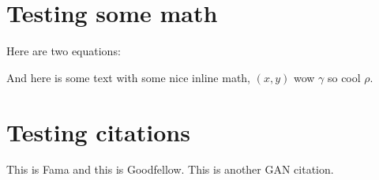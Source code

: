 \section{Testing some math}
Here are two equations:





And here is some text with some nice inline math, $(x, y)$ wow $\gamma$ so cool $\rho$.


\section{Testing citations}
This is Fama\cite{fama_efficient_market} and this is Goodfellow.
This is another GAN citation.